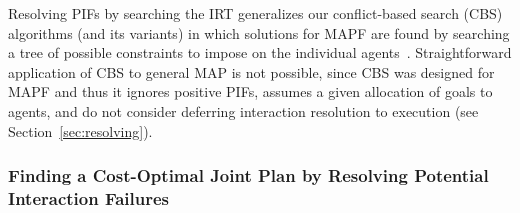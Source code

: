 \documentclass[11pt]{article}
\begin{document}
Resolving PIFs by searching the IRT generalizes our conflict-based search (CBS) algorithms (and its variants) in which solutions for MAPF are found by searching a tree of possible constraints to impose on the individual agents~\cite{sharon2015conflict-based,boyarski2015don,boyarski2015icbs}. Straightforward application of CBS to general MAP is not possible, since CBS was designed for MAPF and thus 
it ignores positive PIFs, assumes a given allocation of goals to agents, and do not consider deferring interaction resolution to execution (see Section~\ref{sec:resolving}). 

 







\subsubsection{Finding a Cost-Optimal Joint Plan by Resolving Potential Interaction Failures}%
\end{document}
